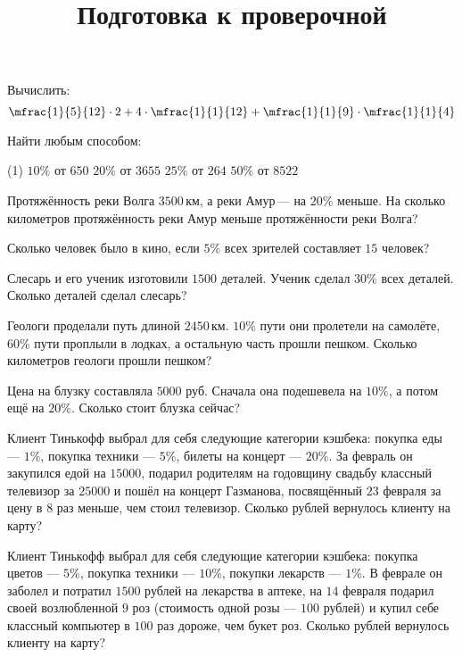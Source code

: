 \begin{class}[number=7]
	\title{Подготовка к проверочной}
	\begin{listofex}
		\item Вычислить:
		\[\mfrac{1}{5}{12}\cdot2+4\cdot\mfrac{1}{1}{12}+\mfrac{1}{1}{9}\cdot\mfrac{1}{1}{4}\]
		\item Найти любым способом:
		\begin{tasks}(1)
			\task \( 10\% \) от \( 650 \)
			\task \( 20\% \) от \( 3655 \)
			\task \( 25\% \) от \( 264 \)
			\task \( 50\% \) от \( 8522 \)
		\end{tasks}
		\item Протяжённость реки Волга \( 3500 \) км, а реки Амур --- на \( 20\% \) меньше. На сколько километров протяжённость реки Амур меньше протяжённости реки Волга?
		\item Сколько человек было в кино, если \( 5\% \) всех зрителей составляет \( 15 \) человек?
		\item Слесарь и его ученик изготовили \( 1500 \) деталей. Ученик сделал \( 30\% \) всех деталей. Сколько деталей сделал слесарь?
		\item Геологи проделали путь длиной \( 2450 \) км. \( 10\% \) пути они пролетели на самолёте, \( 60\% \) пути проплыли в лодках, а остальную часть прошли пешком. Сколько километров геологи прошли пешком?
		\item Цена на блузку составляла \( 5000 \) руб. Сначала она подешевела на \( 10\% \), а потом ещё на \( 20\% \). Сколько стоит блузка сейчас?
		\item Клиент Тинькофф выбрал для себя следующие категории кэшбека: покупка еды --- \( 1\% \), покупка техники --- \( 5\% \), билеты на концерт --- \( 20\% \). За февраль он закупился едой на \( 15000 \), подарил родителям на годовщину свадьбу классный телевизор за \( 25000 \) и пошёл на концерт Газманова, посвящённый \( 23 \) февраля за цену в \( 8 \) раз меньше, чем стоил телевизор. Сколько рублей вернулось клиенту на карту? 
	\end{listofex}
\end{class}

\begin{exam}
	\begin{listofex}
		\item Клиент Тинькофф выбрал для себя следующие категории кэшбека: покупка цветов --- \( 5\% \), покупка техники --- \( 10\% \), покупки лекарств --- \( 1\% \). В феврале он заболел и потратил \( 1500 \) рублей на лекарства в аптеке, на \( 14 \) февраля подарил своей возлюбленной \( 9 \) роз (стоимость одной розы --- \( 100 \) рублей) и купил себе классный компьютер в \( 100 \) раз дороже, чем букет роз. Сколько рублей вернулось клиенту на карту? 
	\end{listofex}
\end{exam}

